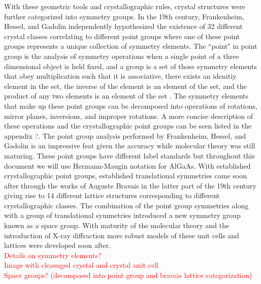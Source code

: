 With these geometric tools and crystallographic rules, crystal structures were further categorized into symmetry groups. In the 19th century, Frankenheim, Hessel, and Gadolin independently hypothesized the existence of 32 different crystal classes correlating to different point groups where one of these point groups represents a unique collection of symmetry elements. The ``point" in point group is the analysis of symmetry operations when a single point of a three dimensional object is held fixed, and a group is a set of those symmetry elements that obey multiplication such that it is associative, there exists an idenitiy element in the set, the inverse of the element is an element of the set, and the product of any two elements is an element of the set \cite{sands}.  The symmetry elements that make up these point groups can be decomposed into operations of rotations, mirror planes, inversions, and improper rotations. A more concise description of these operations and the crystallographic point groups can be seen listed in the appendix \textcolor{red}{?}. The point group analysis performed by Frankenheim, Hessel, and Gadolin is an impressive feat given the accuracy while molecular theory was still maturing. These point groups have different label standards but throughout this document we will use Hermann-Maugin notation for AlGaAs. With established crystallographic point groups, established translational symmetries came soon after through the works of Auguste Bravais in the latter part of the 19th century giving rise to 14 different lattice structures corresponding to different crystallographic classes.  The combination of the point group symmetries along with a group of translational symmetries introduced a new symmetry group known as a space group. With maturity of the molecular theory and the introduction of X-ray diffraction more robust models of these unit cells and lattices were developed soon after.
\\
\textcolor{red}{Details on symmetry elements?}
\\
\textcolor{red}{Image with cleavaged crystal and crystal unit cell}
\\
\textcolor{red}{Space groups? (decomposed into point group and bravais lattice categorization)}



